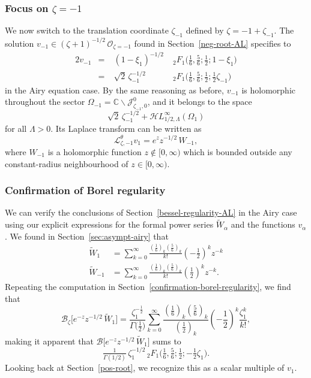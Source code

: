 \documentclass{article}
\newcommand{\singexp}[2]{\mathcal{H}L^\infty_{#1, #2}}
\newcommand{\C}{\mathbb{C}}
\newcommand{\laplace}{\mathcal{L}}
\newcommand{\borel}{\mathcal{B}}
\theoremstyle{definition}
\theoremstyle{plain}
\begin{document}
\subsubsection{Focus on $\zeta = -1$}\label{neg-root}
We now switch to the translation coordinate $\zeta_{-1}$ defined by $\zeta = -1 + \zeta_{-1}$. The solution $v_{-1} \in (\zeta+1)^{-1/2}\,\mathcal{O}_{\zeta=-1}$ found in Section~\ref{neg-root-AL} specifies to
\begin{alignat*}{2}
v_{-1} &=\;& (1-\xi_1)^{-1/2} &\;{}_2F_1\big(\tfrac{1}{6}, \tfrac{5}{6}; \tfrac{1}{2}; 1-\xi_1\big) \\[1mm]
&=\;& \sqrt{2}\,\zeta_{-1}^{-1/2} &\;{}_2F_1\big(\tfrac{1}{6}, \tfrac{5}{6}; \tfrac{1}{2}; \tfrac{1}{2}\zeta_{-1}\big)
\end{alignat*}
in the Airy equation case. By the same reasoning as before, $v_{-1}$ is holomorphic throughout the sector $\Omega_{-1} = \C \smallsetminus \mathcal{J}^0_{\zeta_{-1}, 0}$, and it belongs to the space
\[ \sqrt{2}\,\zeta_{-1}^{-1/2} + \singexp{1/2}{\Lambda}(\Omega_1) \]
for all $\Lambda > 0$. Its Laplace transform can be written as
\[ \laplace^\theta_{\zeta, -1} v_1 = e^z z^{-1/2}\,W_{-1}, \]
where $W_{-1}$ is a holomorphic function $z \notin [0, \infty)$ which is bounded outside any constant-radius neighbourhood of $z \in [0, \infty)$.
%
\subsubsection{Confirmation of Borel regularity}\label{confirmation-borel-regularity-airy}
%
We can verify the conclusions of Section~\ref{bessel-regularity-AL} in the Airy case using our explicit expressions for the formal power series $\tilde{W}_\alpha$ and the functions $v_\alpha$. We found in Section~\ref{sec:asympt-airy} that
\begin{align*}
\tilde{W}_1 & = \sum_{k = 0}^{\infty} \frac{\left(\tfrac{1}{6}\right)_k \left(\tfrac{5}{6}\right)_k}{k!} \left(-\frac{1}{2}\right)^k z^{-k} \\
\tilde{W}_{-1} & = \sum_{k = 0}^{\infty} \frac{\left(\tfrac{1}{6}\right)_k \left(\tfrac{5}{6}\right)_k}{k!} \left(\frac{1}{2}\right)^k z^{-k}.
\end{align*}
Repeating the computation in Section~\ref{confirmation-borel-regularity}, we find that
\[ \borel_\zeta \big[ e^{-z} z^{-1/2}\,\tilde{W}_1 \big] = \frac{\zeta_1^{-\frac{1}{2}}}{\Gamma\big(\frac{1}{2}\big)} \sum_{k = 0}^{\infty} \frac{\left(\tfrac{1}{6}\right)_k \left(\tfrac{5}{6}\right)_k}{\left(\frac{1}{2}\right)_k} \left(-\frac{1}{2}\right)^k \frac{\zeta_1^k}{k!}, \]
making it apparent that $\borel\big[ e^{-z} z^{-1/2}\,\tilde{W}_1 \big]$ sums to
\[ \tfrac{1}{\Gamma(1/2)}\,\zeta_1^{-1/2}\,{}_2F_1\big(\tfrac{1}{6}, \tfrac{5}{6}; \tfrac{1}{2}; -\tfrac{1}{2}\zeta_1\big). \]
Looking back at Section~\ref{pos-root}, we recognize this as a scalar multiple of $v_1$.
\end{document}
